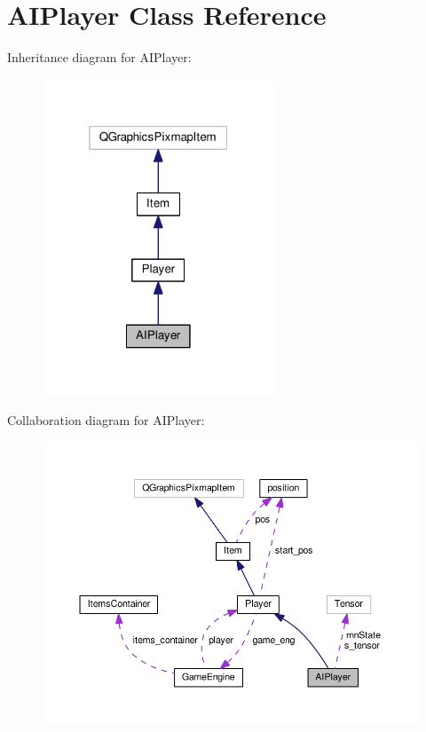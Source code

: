 \hypertarget{class_a_i_player}{}\section{A\+I\+Player Class Reference}
\label{class_a_i_player}


Inheritance diagram for A\+I\+Player\+:\nopagebreak
\begin{figure}[H]
\begin{center}
\leavevmode
\includegraphics[width=196pt]{class_a_i_player__inherit__graph}
\end{center}
\end{figure}


Collaboration diagram for A\+I\+Player\+:\nopagebreak
\begin{figure}[H]
\begin{center}
\leavevmode
\includegraphics[width=350pt]{class_a_i_player__coll__graph}
\end{center}
\end{figure}
